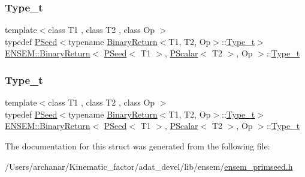 \subsubsection{\texorpdfstring{Type\_t}{Type\_t}\hspace{0.1cm}{\footnotesize\ttfamily [1/2]}}
{\footnotesize\ttfamily template$<$class T1 , class T2 , class Op $>$ \\
typedef \mbox{\hyperlink{classENSEM_1_1PSeed}{P\+Seed}}$<$typename \mbox{\hyperlink{structENSEM_1_1BinaryReturn}{Binary\+Return}}$<$T1, T2, Op$>$\+::\mbox{\hyperlink{structENSEM_1_1BinaryReturn_3_01PSeed_3_01T1_01_4_00_01PScalar_3_01T2_01_4_00_01Op_01_4_a4130a6d592ca5e069c711c81b422aa54}{Type\+\_\+t}}$>$ \mbox{\hyperlink{structENSEM_1_1BinaryReturn}{E\+N\+S\+E\+M\+::\+Binary\+Return}}$<$ \mbox{\hyperlink{classENSEM_1_1PSeed}{P\+Seed}}$<$ T1 $>$, \mbox{\hyperlink{classENSEM_1_1PScalar}{P\+Scalar}}$<$ T2 $>$, Op $>$\+::\mbox{\hyperlink{structENSEM_1_1BinaryReturn_3_01PSeed_3_01T1_01_4_00_01PScalar_3_01T2_01_4_00_01Op_01_4_a4130a6d592ca5e069c711c81b422aa54}{Type\+\_\+t}}}

\mbox{\label{structENSEM_1_1BinaryReturn_3_01PSeed_3_01T1_01_4_00_01PScalar_3_01T2_01_4_00_01Op_01_4_a4130a6d592ca5e069c711c81b422aa54}} 
\subsubsection{\texorpdfstring{Type\_t}{Type\_t}\hspace{0.1cm}{\footnotesize\ttfamily [2/2]}}
{\footnotesize\ttfamily template$<$class T1 , class T2 , class Op $>$ \\
typedef \mbox{\hyperlink{classENSEM_1_1PSeed}{P\+Seed}}$<$typename \mbox{\hyperlink{structENSEM_1_1BinaryReturn}{Binary\+Return}}$<$T1, T2, Op$>$\+::\mbox{\hyperlink{structENSEM_1_1BinaryReturn_3_01PSeed_3_01T1_01_4_00_01PScalar_3_01T2_01_4_00_01Op_01_4_a4130a6d592ca5e069c711c81b422aa54}{Type\+\_\+t}}$>$ \mbox{\hyperlink{structENSEM_1_1BinaryReturn}{E\+N\+S\+E\+M\+::\+Binary\+Return}}$<$ \mbox{\hyperlink{classENSEM_1_1PSeed}{P\+Seed}}$<$ T1 $>$, \mbox{\hyperlink{classENSEM_1_1PScalar}{P\+Scalar}}$<$ T2 $>$, Op $>$\+::\mbox{\hyperlink{structENSEM_1_1BinaryReturn_3_01PSeed_3_01T1_01_4_00_01PScalar_3_01T2_01_4_00_01Op_01_4_a4130a6d592ca5e069c711c81b422aa54}{Type\+\_\+t}}}



The documentation for this struct was generated from the following file\+:\begin{DoxyCompactItemize}
\item 
/\+Users/archanar/\+Kinematic\+\_\+factor/adat\+\_\+devel/lib/ensem/\mbox{\hyperlink{lib_2ensem_2ensem__primseed_8h}{ensem\+\_\+primseed.\+h}}\end{DoxyCompactItemize}
